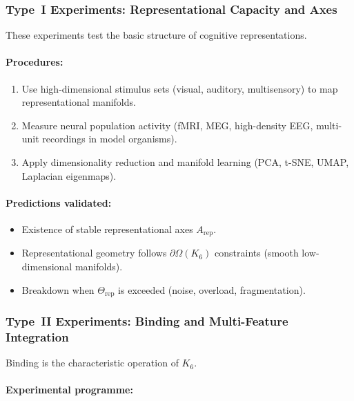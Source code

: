 \subsubsection{Type~I Experiments: Representational Capacity and Axes}

These experiments test the basic structure of cognitive
representations.

\paragraph{Procedures:}

\begin{enumerate}
    \item Use high-dimensional stimulus sets (visual, auditory,
          multisensory) to map representational manifolds.
    \item Measure neural population activity (fMRI, MEG, high-density EEG,
          multi-unit recordings in model organisms).
    \item Apply dimensionality reduction and manifold learning
          (PCA, t-SNE, UMAP, Laplacian eigenmaps).
\end{enumerate}

\paragraph{Predictions validated:}

\begin{itemize}
    \item Existence of stable representational axes $A_{\mathrm{rep}}$.
    \item Representational geometry follows $\partial\Omega(K_6)$
          constraints (smooth low-dimensional manifolds).
    \item Breakdown when $\Theta_{\mathrm{rep}}$ is exceeded
          (noise, overload, fragmentation).
\end{itemize}



\subsubsection{Type~II Experiments: Binding and Multi-Feature Integration}

Binding is the characteristic operation of $K_6$.

\paragraph{Experimental programme:}

